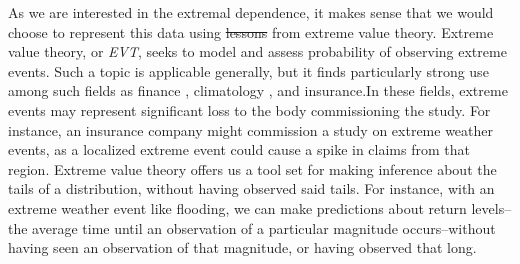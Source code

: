 As we are interested in the extremal dependence, it makes sense that we would choose to represent
  this data using \st{lessons}  from extreme value theory.  Extreme value theory, or \emph{EVT}, seeks
  to model and assess probability of observing extreme events.  Such a topic is applicable
  generally, but it finds particularly strong use among such fields as finance \citep{allen2013},
  climatology \citep{trepanier2018}, and insurance.\findcite  In these fields, extreme events may
  represent significant loss to the body commissioning the study.  For instance, an insurance
  company might commission a study on extreme weather events, as a localized extreme event could
  cause a spike in claims from that region.  Extreme value theory offers us a tool set for making
  inference about the tails of a distribution, without having observed said tails.  For instance,
  with an extreme weather event like flooding, we can make predictions about return levels--the
  average time until an observation of a particular magnitude occurs--without having seen an
  observation of that magnitude, or having observed that long.



